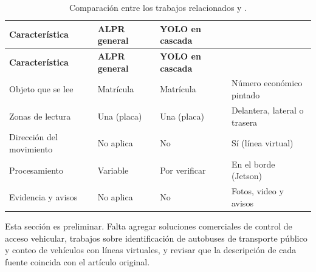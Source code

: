 \begin{longtable}{@{}L{3.6cm}L{3.3cm}L{3.3cm}L{3.6cm}@{}}
  \caption{Comparación entre los trabajos relacionados y \saru{}.}
  \label{tab:comparacion} \\
  \toprule
  \textbf{Característica} & \textbf{ALPR general~\cite{shashirangana2021alpr}}
    & \textbf{YOLO en cascada~\cite{laroca2018yolo}} & \textbf{\saru{}} \\
  \midrule
  \endfirsthead
  \toprule
  \textbf{Característica} & \textbf{ALPR general} & \textbf{YOLO en cascada}
    & \textbf{\saru{}} \\
  \midrule
  \endhead
  Objeto que se lee & Matrícula & Matrícula & Número económico pintado \\
  Zonas de lectura & Una (placa) & Una (placa) & Delantera, lateral o
    trasera \\
  Dirección del movimiento & No aplica & No & Sí (línea virtual) \\
  Procesamiento & Variable & Por verificar & En el borde (Jetson) \\
  Evidencia y avisos & No aplica & No & Fotos, video y avisos \\
  \bottomrule
\end{longtable}

\begin{nota}[title={Por completar}]
Esta sección es preliminar. Falta agregar soluciones comerciales de control
de acceso vehicular, trabajos sobre identificación de autobuses de
transporte público y conteo de vehículos con líneas virtuales, y revisar
que la descripción de cada fuente coincida con el artículo original.
\end{nota}
